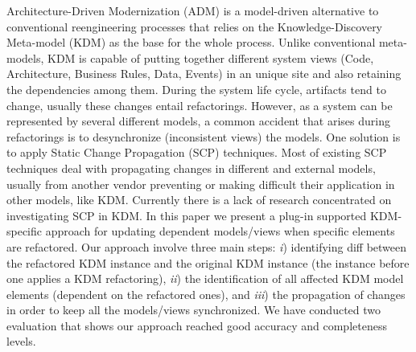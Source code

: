 Architecture-Driven Modernization (ADM) is a model-driven alternative to conventional reengineering processes that relies on the Knowledge-Discovery Meta-model (KDM) as the base for the whole process. Unlike conventional meta-models, KDM is capable of putting together different system views (Code, Architecture, Business Rules, Data, Events) in an unique site and also retaining the dependencies among them. During the system life cycle, artifacts tend to change, usually these changes entail refactorings. However, as a system can be represented by several different models, a common accident that arises during refactorings is to desynchronize (inconsistent views) the models. One solution is to apply Static Change Propagation (SCP) techniques. Most of existing SCP techniques deal with propagating changes in different and external models, usually from another vendor preventing or making difficult their application in other models, like KDM. Currently there is a lack of research concentrated on investigating SCP in KDM. In this paper we present a plug-in supported KDM-specific approach for updating dependent models/views when specific elements are refactored. Our approach involve three main steps: \textit{i}) identifying diff between the refactored KDM instance and the original KDM instance (the instance before one applies a KDM refactoring), \textit{ii}) the identification of all affected KDM model elements (dependent on the refactored ones), and \textit{iii}) the propagation of changes in order to keep all the models/views synchronized. We have conducted two evaluation that shows our approach reached good accuracy and completeness levels.